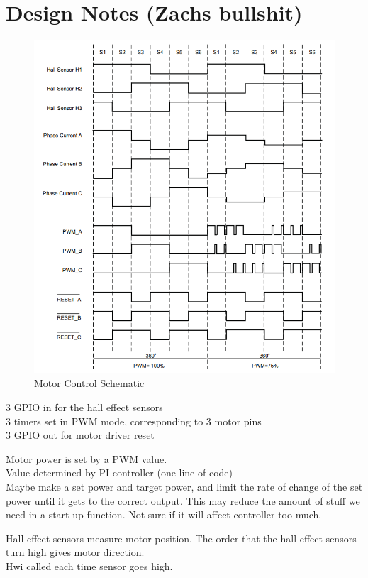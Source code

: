 \documentclass[titlepage]{article}
\begin{document}
\section{Design Notes (Zachs bullshit)}
\begin{figure}[h]
\caption{Motor Control Schematic}
\includegraphics[scale=0.4]{motor_order.png}
\end{figure}

3 GPIO in for the hall effect sensors\\
3 timers set in PWM mode, corresponding to 3 motor pins\\
3 GPIO out for motor driver reset

Motor power is set by a PWM value.\\
Value determined by PI controller (one line of code)\\
Maybe make a set power and target power, and limit the rate of change of the set power until it gets to the correct output. This may reduce the amount of stuff we need in a start up function. Not sure if it will affect controller too much.


Hall effect sensors measure motor position. The order that the hall effect sensors turn high gives motor direction. \\
Hwi called each time sensor goes high.
\end{document}
